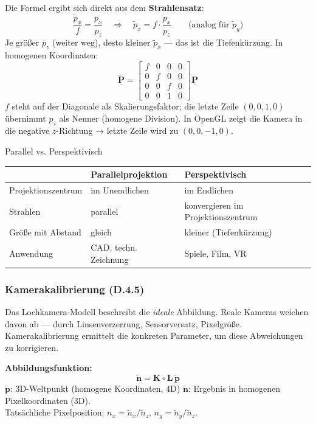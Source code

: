 \documentclass[12pt, a4paper]{article}
\begin{document}
Die Formel ergibt sich direkt aus dem \textbf{Strahlensatz}:
\[
  \frac{\tilde{p}_x}{f} = \frac{p_x}{p_z}
  \quad\Rightarrow\quad
  \tilde{p}_x = f \cdot \frac{p_x}{p_z}
  \qquad \text{(analog für } \tilde{p}_y\text{)}
\]
Je größer $p_z$ (weiter weg), desto kleiner $\tilde{p}_x$ — das ist die Tiefenkürzung. In homogenen Koordinaten:
\[
  \tilde{\underline{\mathbf{P}}} =
  \begin{bmatrix}f&0&0&0\\0&f&0&0\\0&0&f&0\\0&0&1&0\end{bmatrix}
  \underline{\mathbf{P}}
\]
$f$ steht auf der Diagonale als Skalierungsfaktor; die letzte Zeile $(0,0,1,0)$ übernimmt $p_z$ als Nenner (homogene Division). In OpenGL zeigt die Kamera in die negative $z$-Richtung → letzte Zeile wird zu $(0,0,-1,0)$.

\begin{notebox}{Parallel vs. Perspektivisch}
\begin{tabular}{lll}
  & \textbf{Parallelprojektion} & \textbf{Perspektivisch} \\
  \hline
  Projektionszentrum & im Unendlichen & im Endlichen \\
  Strahlen & parallel & konvergieren im Projektionszentrum \\
  Größe mit Abstand & gleich & kleiner (Tiefenkürzung) \\
  Anwendung & CAD, techn. Zeichnung & Spiele, Film, VR \\
\end{tabular}
\end{notebox}

\subsubsection*{Kamerakalibrierung (D.4.5)}

Das Lochkamera-Modell beschreibt die \textit{ideale} Abbildung. Reale Kameras weichen davon ab — durch Linsenverzerrung, Sensorversatz, Pixelgröße. Kamerakalibrierung ermittelt die konkreten Parameter, um diese Abweichungen zu korrigieren.

\textbf{Abbildungsfunktion:}
\[
  \tilde{\mathbf{n}} = \mathbf{K} \circ \mathbf{L}\,\tilde{\mathbf{p}}
\]
$\tilde{\mathbf{p}}$: 3D-Weltpunkt (homogene Koordinaten, 4D) \quad $\tilde{\mathbf{n}}$: Ergebnis in homogenen Pixelkoordinaten (3D).\\
Tatsächliche Pixelposition: $n_x = \tilde{n}_x/\tilde{n}_z$, \quad $n_y = \tilde{n}_y/\tilde{n}_z$.
\end{document}
